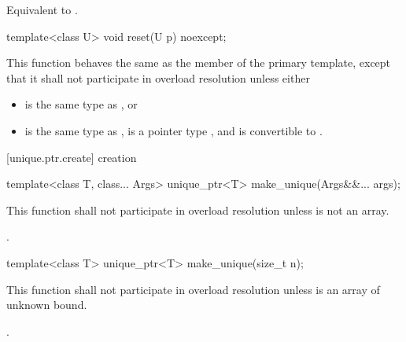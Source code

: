 \begin{itemdescr}
\pnum
\effects Equivalent to .
\end{itemdescr}

%
\begin{itemdecl}
template<class U> void reset(U p) noexcept;
\end{itemdecl}

\begin{itemdescr}
\pnum
This function behaves the same as
the  member of the primary template,
except that it shall not participate in overload resolution
unless either

\begin{itemize}
\item {} is the same type as , or
\item {} is the same type as ,
       is a pointer type , and
       is convertible to .
\end{itemize}
\end{itemdescr}

[unique.ptr.create]{ creation}

%
\begin{itemdecl}
template<class T, class... Args> unique_ptr<T> make_unique(Args&&... args);
\end{itemdecl}

\begin{itemdescr}
\pnum
\remarks This function shall not participate in overload resolution unless  is not an array.

\pnum
\returns {}.

\end{itemdescr}

%
\begin{itemdecl}
template<class T> unique_ptr<T> make_unique(size_t n);
\end{itemdecl}

\begin{itemdescr}
\pnum
\remarks This function shall not participate in overload resolution unless  is an array of unknown bound.

\pnum
\returns {}.

\end{itemdescr}

